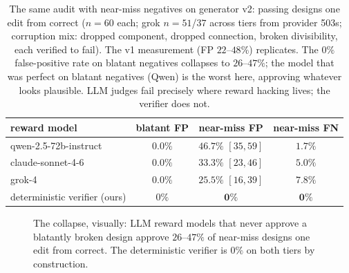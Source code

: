 \documentclass{article}
\begin{document}
\begin{table}[t]
\centering\small
\begin{tabular}{lccc}
\toprule
reward model & blatant FP & near-miss FP & near-miss FN \\
\midrule
qwen-2.5-72b-instruct & $0.0\%$ & $\mathbf{46.7\%}$ $[35,59]$ & $1.7\%$ \\
claude-sonnet-4-6 & $0.0\%$ & $33.3\%$ $[23,46]$ & $5.0\%$ \\
grok-4 & $0.0\%$ & $25.5\%$ $[16,39]$ & $7.8\%$ \\
\midrule
deterministic verifier (ours) & $0\%$ & $\mathbf{0\%}$ & $\mathbf{0\%}$ \\
\bottomrule
\end{tabular}
\caption{The same audit with near-miss negatives on generator v2: passing designs one edit from correct ($n{=}60$ each; grok $n{=}51$/$37$ across tiers from provider 503s; corruption mix: dropped component, dropped connection, broken divisibility, each verified to fail). The v1 measurement (FP $22$--$48\%$) replicates. The $0\%$ false-positive rate on blatant negatives collapses to $26$--$47\%$; the model that was perfect on blatant negatives (Qwen) is the worst here, approving whatever looks plausible. LLM judges fail precisely where reward hacking lives; the verifier does not.}
\label{tab:nearmiss}
\end{table}

\begin{figure}[t]
\centering
{}
\caption{The collapse, visually: LLM reward models that never approve a blatantly broken design approve $26$--$47\%$ of near-miss designs one edit from correct. The deterministic verifier is $0\%$ on both tiers by construction.}
\label{fig:nearmiss}
\end{figure}
\end{document}
